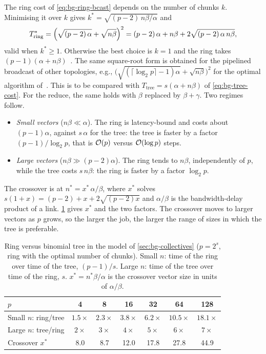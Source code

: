 The ring cost of \cref{eq:bg-ring-bcast} depends on the number of chunks $k$.
Minimising it over $k$ gives $k^\ast=\sqrt{(p-2)\,n\beta/\alpha}$ and
\begin{equation}
  T_{\text{ring}}^{\ast}=\Bigl(\sqrt{(p-2)\,\alpha}+\sqrt{n\beta}\Bigr)^{2}
  =(p-2)\,\alpha+n\beta+2\sqrt{(p-2)\,\alpha\,n\beta},
  \label{eq:bg-ring-opt}
\end{equation}
valid when $k^\ast\ge1$. Otherwise the best choice is $k=1$ and the ring takes $(p-1)(\alpha+n\beta)$~\cite[Sec.~3.3.1]{casanova2008parallel}.  The same square-root form is obtained for the pipelined broadcast of other topologies, e.g., $\bigl(\sqrt{(\lceil\log_2p\rceil-1)\alpha}+\sqrt{n\beta}\bigr)^2$ for the optimal algorithm of~\cite{traff2005optimal}.
This is to be compared with $T_{\text{tree}}=s(\alpha+n\beta)$ of \cref{eq:bg-tree-cost}.
For the reduce, the same holds with $\beta$ replaced by $\beta+\gamma$.
Two regimes follow.
\begin{itemize}
  \item \emph{Small vectors} ($n\beta\ll\alpha$). The ring is latency-bound and costs about $(p-1)\alpha$, against $s\,\alpha$ for the tree: the tree is faster by a factor $(p-1)/\log_2 p$, that is $\mathcal{O}\!\left(p\right)$ versus $\mathcal{O}\!\left(\log p\right)$ steps.
  \item \emph{Large vectors} ($n\beta\gg(p-2)\alpha$). The ring tends to $n\beta$, independently of $p$, while the tree costs $s\,n\beta$: the ring is faster by a factor $\log_2 p$.
\end{itemize}
The crossover is at $n^\ast=x^\ast\,\alpha/\beta$, where $x^\ast$ solves $s(1+x)=(p-2)+x+2\sqrt{(p-2)x}$ and $\alpha/\beta$ is the bandwidth-delay product of a link.
\cref{tab:bg-ring-vs-tree} gives $x^\ast$ and the two factors.
The crossover moves to larger vectors as $p$ grows, so the larger the job, the larger the range of sizes in which the tree is preferable.

\begin{table}[t]
\centering
\small
\caption{Ring versus binomial tree in the model of \cref{sec:bg-collectives} ($p=2^s$, ring with the optimal number of chunks). Small $n$: time of the ring over time of the tree, $(p-1)/s$. Large $n$: time of the tree over time of the ring, $s$. $x^\ast=n^\ast\beta/\alpha$ is the crossover vector size in units of $\alpha/\beta$.}
\label{tab:bg-ring-vs-tree}
\begin{tabular}{@{}lcccccc@{}}
\toprule
$p$ & 4 & 8 & 16 & 32 & 64 & 128 \\
\midrule
Small $n$: ring/tree      & $1.5\times$ & $2.3\times$ & $3.8\times$ & $6.2\times$ & $10.5\times$ & $18.1\times$ \\
Large $n$: tree/ring      & $2\times$   & $3\times$   & $4\times$   & $5\times$   & $6\times$    & $7\times$ \\
Crossover $x^\ast$        & 8.0         & 8.7         & 12.0        & 17.8        & 27.8         & 44.9 \\
\bottomrule
\end{tabular}
\end{table}

